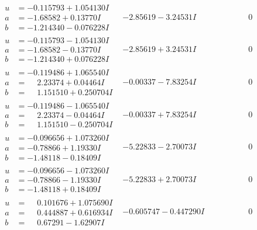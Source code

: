 \documentclass[1p]{elsarticle_modified}
\theoremstyle{definition}
\begin{document}
$$\begin{array}{c|c|c}
\begin{aligned}
u &= -0.115793 + 1.054130 I \\
a &= -1.68582 + 0.13770 I \\
b &= -1.214340 - 0.076228 I\end{aligned}
 & -2.85619 - 3.24531 I & \phantom{-0.000000 } 0 \\ \hline\begin{aligned}
u &= -0.115793 - 1.054130 I \\
a &= -1.68582 - 0.13770 I \\
b &= -1.214340 + 0.076228 I\end{aligned}
 & -2.85619 + 3.24531 I & \phantom{-0.000000 } 0 \\ \hline\begin{aligned}
u &= -0.119486 + 1.065540 I \\
a &= \phantom{-}2.23374 + 0.04464 I \\
b &= \phantom{-}1.151510 + 0.250704 I\end{aligned}
 & -0.00337 - 7.83254 I & \phantom{-0.000000 } 0 \\ \hline\begin{aligned}
u &= -0.119486 - 1.065540 I \\
a &= \phantom{-}2.23374 - 0.04464 I \\
b &= \phantom{-}1.151510 - 0.250704 I\end{aligned}
 & -0.00337 + 7.83254 I & \phantom{-0.000000 } 0 \\ \hline\begin{aligned}
u &= -0.096656 + 1.073260 I \\
a &= -0.78866 + 1.19330 I \\
b &= -1.48118 - 0.18409 I\end{aligned}
 & -5.22833 - 2.70073 I & \phantom{-0.000000 } 0 \\ \hline\begin{aligned}
u &= -0.096656 - 1.073260 I \\
a &= -0.78866 - 1.19330 I \\
b &= -1.48118 + 0.18409 I\end{aligned}
 & -5.22833 + 2.70073 I & \phantom{-0.000000 } 0 \\ \hline\begin{aligned}
u &= \phantom{-}0.101676 + 1.075690 I \\
a &= \phantom{-}0.444887 + 0.616934 I \\
b &= \phantom{-}0.67291 - 1.62907 I\end{aligned}
 & -0.605747 - 0.447290 I & \phantom{-0.000000 } 0 \\ \hline\begin{aligned}

\end{aligned}
\end{array}$$
\end{document}
